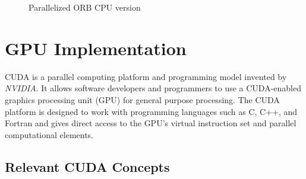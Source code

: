 \documentclass[]{article}
\begin{document}
\begin{figure}[H]
	\begin{center}
	\end{center}
	\caption{Parallelized ORB CPU version}
	\label{fig:orbp}
\end{figure}



\newpage
\section{GPU Implementation}\label{sec:gpuimpl}

CUDA is a parallel computing platform and programming model invented by \textit{NVIDIA}. It allows software developers and programmers to use a CUDA-enabled graphics processing unit (GPU) for general purpose processing.
The CUDA platform is designed to work with programming languages such as C, C++, and Fortran and gives direct access to the GPU's virtual instruction set and parallel computational elements.

\subsection{Relevant CUDA Concepts}
\end{document}
